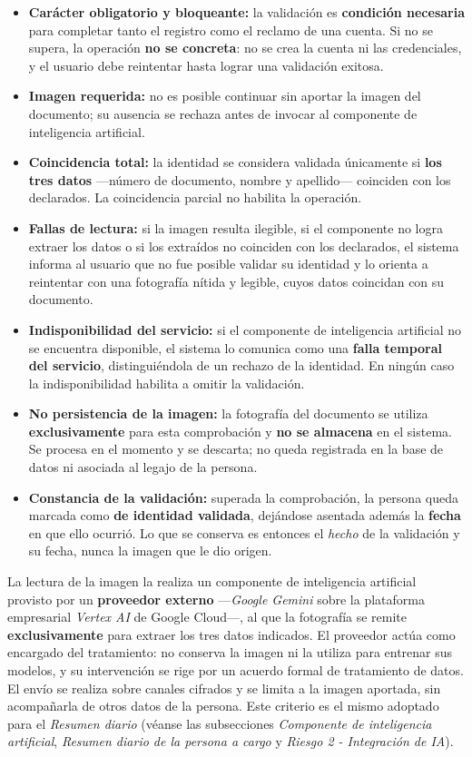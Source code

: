 \documentclass[a4paper,12pt]{article}
\begin{document}
    \begin{itemize}
        \item \textbf{Carácter obligatorio y bloqueante:} la validación es \textbf{condición necesaria} para completar tanto el registro como el reclamo de una cuenta. Si no se supera, la operación \textbf{no se concreta}: no se crea la cuenta ni las credenciales, y el usuario debe reintentar hasta lograr una validación exitosa.
        \item \textbf{Imagen requerida:} no es posible continuar sin aportar la imagen del documento; su ausencia se rechaza antes de invocar al componente de inteligencia artificial.
        \item \textbf{Coincidencia total:} la identidad se considera validada únicamente si \textbf{los tres datos} —número de documento, nombre y apellido— coinciden con los declarados. La coincidencia parcial no habilita la operación.
        \item \textbf{Fallas de lectura:} si la imagen resulta ilegible, si el componente no logra extraer los datos o si los extraídos no coinciden con los declarados, el sistema informa al usuario que no fue posible validar su identidad y lo orienta a reintentar con una fotografía nítida y legible, cuyos datos coincidan con su documento.
        \item \textbf{Indisponibilidad del servicio:} si el componente de inteligencia artificial no se encuentra disponible, el sistema lo comunica como una \textbf{falla temporal del servicio}, distinguiéndola de un rechazo de la identidad. En ningún caso la indisponibilidad habilita a omitir la validación.
        \item \textbf{No persistencia de la imagen:} la fotografía del documento se utiliza \textbf{exclusivamente} para esta comprobación y \textbf{no se almacena} en el sistema. Se procesa en el momento y se descarta; no queda registrada en la base de datos ni asociada al legajo de la persona.
        \item \textbf{Constancia de la validación:} superada la comprobación, la persona queda marcada como \textbf{de identidad validada}, dejándose asentada además la \textbf{fecha} en que ello ocurrió. Lo que se conserva es entonces el \textit{hecho} de la validación y su fecha, nunca la imagen que le dio origen.
    \end{itemize}
    \par La lectura de la imagen la realiza un componente de inteligencia artificial provisto por un \textbf{proveedor externo} —\textit{Google Gemini} sobre la plataforma empresarial \textit{Vertex AI} de Google Cloud—, al que la fotografía se remite \textbf{exclusivamente} para extraer los tres datos indicados. El proveedor actúa como encargado del tratamiento: no conserva la imagen ni la utiliza para entrenar sus modelos, y su intervención se rige por un acuerdo formal de tratamiento de datos\cite{GoogleCloudDataGovernance}. El envío se realiza sobre canales cifrados y se limita a la imagen aportada, sin acompañarla de otros datos de la persona. Este criterio es el mismo adoptado para el \textit{Resumen diario} (véanse las subsecciones \textit{Componente de inteligencia artificial}, \textit{Resumen diario de la persona a cargo} y \textit{Riesgo 2 - Integración de IA}).
\end{document}
